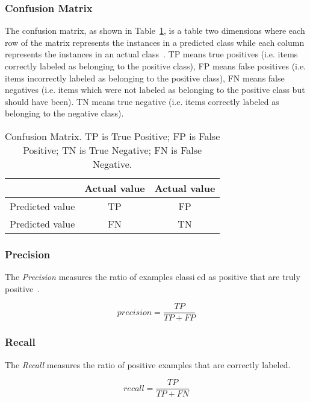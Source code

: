 \subsubsection{Confusion Matrix}
The confusion matrix,
as shown in Table~\ref{tb:confusion},
is a table two dimensions
where each row of the matrix represents the instances
in a predicted class while
each column represents the instances
in an actual class~\cite{powers2011evaluation}.
TP means true positives
(i.e. items correctly labeled as belonging to the positive
class),
FP means false positives
(i.e. items incorrectly labeled as belonging to the
positive class),
FN means false negatives
(i.e. items which were not labeled as
belonging to the positive class but should have been).
TN means true negative
(i.e. items correctly labeled as belonging to the negative
class).

\begin{table}  \centering
  \caption{Confusion Matrix.
  TP is True Positive;
  FP is False Positive;
  TN is True Negative;
  FN is False Negative. }
  \label{tb:confusion}
  \begin{tabular}{ccc}
  \toprule
    & Actual value   &  Actual value    \\
  \midrule
  Predicted value  & TP & FP  \\
  Predicted value    & FN & TN  \\
  \bottomrule
  \end{tabular}
\end{table}


\subsubsection{Precision}

The \textit{Precision} measures the ratio of
examples classied as positive that
are truly positive~\cite{ting2010precision}.

\begin{equation}
  precision=\frac{TP}{TP+FP}
\end{equation}

\subsubsection{Recall}
The \textit{Recall} measures the ratio of positive examples that
are correctly labeled.

\begin{equation}
  recall=\frac{TP}{TP+FN}
\end{equation}

